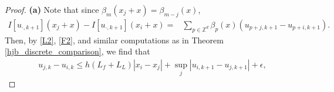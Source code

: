 \documentclass[a4paper,  twoside, 10pt, leqno]{amsart}
\newcommand{\Z}{\mathbb{Z}}
\newcommand{\R}{\mathbb{R}}
\theoremstyle{remark}
\theoremstyle{definition}
\begin{document}
\begin{proof}\textbf{(a)} Note that since
    $\beta_{m} (x_{j}+x) = \beta_{m-j} (x)$,
\begin{align}  \label{partition_unity}
    I [u_{\cdot, k+1}] (x_{j} + x) - I[u_{\cdot,k+1}](x_i + x) = &  \sum_{p \in \Z^d} \beta_p (x) (u_{p+j,k+1} - u_{p+i,k+1} ) .
\end{align}
Then, by \ref{L2}, \ref{F2}, and similar
computations as in Theorem \ref{hjb_discrete_comparison}, we find that
%
\begin{align*}%
   u_{j,k}   - u_{i,k} 
  \leq h(L_f+L_L) |x_i-x_j| + \sup_j |u_{i,k+1}-u_{j,k+1}| + \epsilon,
\end{align*}

\end{proof}
\end{document}
